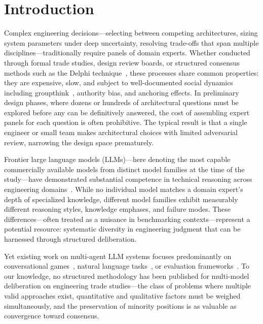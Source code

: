 \documentclass[11pt,a4paper]{article}
\begin{document}
\onehalfspacing

\section{Introduction}
\label{sec:introduction}

Complex engineering decisions---selecting between competing architectures, sizing system parameters under deep uncertainty, resolving trade-offs that span multiple disciplines---traditionally require panels of domain experts. Whether conducted through formal trade studies, design review boards, or structured consensus methods such as the Delphi technique~\cite{linstone1975delphi}, these processes share common properties: they are expensive, slow, and subject to well-documented social dynamics including groupthink~\cite{janis1982groupthink}, authority bias, and anchoring effects. In preliminary design phases, where dozens or hundreds of architectural questions must be explored before any can be definitively answered, the cost of assembling expert panels for each question is often prohibitive. The typical result is that a single engineer or small team makes architectural choices with limited adversarial review, narrowing the design space prematurely.

Frontier large language models (LLMs)---here denoting the most capable commercially available models from distinct model families at the time of the study---have demonstrated substantial competence in technical reasoning across engineering domains~\cite{bubeck2023sparks,openai2024gpt4}. While no individual model matches a domain expert's depth of specialized knowledge, different model families exhibit measurably different reasoning styles, knowledge emphases, and failure modes. These differences---often treated as a nuisance in benchmarking contexts---represent a potential resource: systematic diversity in engineering judgment that can be harnessed through structured deliberation.

Yet existing work on multi-agent LLM systems focuses predominantly on conversational games~\cite{du2023debate}, natural language tasks~\cite{wu2023autogen}, or evaluation frameworks~\cite{zheng2024judging}. To our knowledge, no structured methodology has been published for multi-model deliberation on engineering trade studies---the class of problems where multiple valid approaches exist, quantitative and qualitative factors must be weighed simultaneously, and the preservation of minority positions is as valuable as convergence toward consensus.
\end{document}
